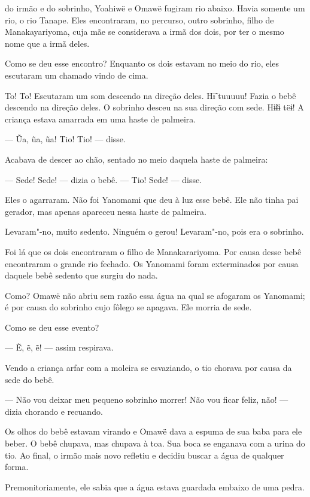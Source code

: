  

 do irmão e do sobrinho, Yoahiwë e Omawë fugiram rio
abaixo. Havia somente um rio, o rio Tanape. Eles encontraram, no
percurso, outro sobrinho, filho de Manakayariyoma, cuja mãe se
considerava a irmã dos dois, por ter o mesmo nome que a irmã deles. 

Como se deu esse encontro? Enquanto os dois estavam no meio do rio, eles
escutaram um chamado vindo de cima. 

To! To! Escutaram um som descendo na direção deles. Hɨ̃ tuuuuu! Fazia o
bebê descendo na direção deles. O sobrinho desceu na sua direção com
sede. Hɨ̃ɨɨ tëɨ! A criança estava amarrada em uma haste de palmeira.

--- Ũa, ũa, ũa! Tio! Tio! --- disse. 

Acabava de descer ao chão, sentado no meio daquela haste de palmeira:

--- Sede! Sede! --- dizia o bebê. --- Tio! Sede! --- disse. 

Eles o agarraram. Não foi Yanomami que deu à luz esse bebê. Ele não
tinha pai gerador, mas apenas apareceu nessa haste de palmeira. 

Levaram"-no, muito sedento. Ninguém o gerou! Levaram"-no, pois era o
sobrinho. 

Foi lá que os dois encontraram o filho de Manakarariyoma. Por causa
desse bebê encontraram o grande rio fechado. Os Yanomami foram
exterminados por causa daquele bebê sedento que surgiu do nada. 

Como? Omawë não abriu sem razão essa água na qual se afogaram os
Yanomami; é por causa do sobrinho cujo fôlego se apagava. Ele morria de
sede. 

Como se deu esse evento?

--- Ẽ, ẽ, ẽ! --- assim respirava. 

Vendo a criança arfar com a moleira se esvaziando, o tio chorava por
causa da sede do bebê. 

--- Não vou deixar meu pequeno sobrinho morrer! Não vou ficar feliz,
não! --- dizia chorando e recuando. 

Os olhos do bebê estavam virando e Omawë dava a espuma de sua baba para
ele beber. O bebê chupava, mas chupava à toa. Sua boca se enganava com a
urina do tio. Ao final, o irmão mais novo refletiu e decidiu buscar a
água de qualquer forma. 

Premonitoriamente, ele sabia que a água estava guardada embaixo de uma
pedra. 

